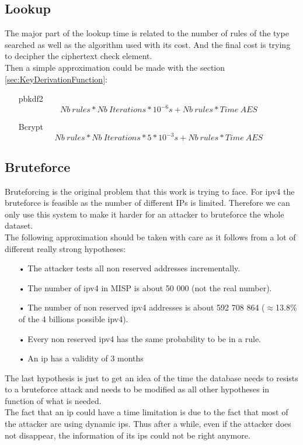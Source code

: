 \documentclass{eplmastersthesis}
\begin{document}
\subsection{Lookup}
The major part of the lookup time is related to the number of rules of the type searched as well as the algorithm used with its cost. And the final cost is trying to decipher the ciphertext check element.\\
Then a simple approximation could be made with the section \ref{sec:KeyDerivationFunction}:
\begin{itemize}
\item[\gls{pbkdf2}] $$Nb\ rules * Nb\ Iterations * 10^{-6}s + Nb\ rules * Time\ AES$$
\item[Bcrypt]  $$Nb\ rules * Nb\ Iterations * 5 * 10^{-3}s + Nb\ rules * Time\ AES$$
\end{itemize}

\subsection{Bruteforce}
Bruteforcing is the original problem that this work is trying to face. For \gls{ipv4} the bruteforce is feasible as the number of different IPs is limited. Therefore we can only use this system to make it harder for an attacker to bruteforce the whole dataset.\\
The following approximation should be taken with care as it follows from a lot of different really strong hypotheses:
\begin{itemize}
\item[•] The attacker tests all non reserved addresses incrementally.
\item[•] The number of \gls{ipv4} in MISP is about 50 000 (not the real number).
\item[•] The number of non reserved \gls{ipv4} addresses is about 592 708 864 ($\approx$13.8\% of the 4 billions possible \gls{ipv4}).
\item[•] Every non reserved \gls{ipv4} has the same probability to be in a rule.
\item[•] An \gls{ip} has a validity of 3 months
\end{itemize}
The last hypothesis is just to get an idea of the time the database needs to resists to a bruteforce attack and needs to be modified as all other hypotheses in function of what is needed.\\
The fact that an \gls{ip} could have a time limitation is due to the fact that most of the attacker are using dynamic \gls{ip}s. Thus after a while, even if the attacker does not disappear, the information of its \gls{ip}s could not be right anymore.\\
\end{document}
